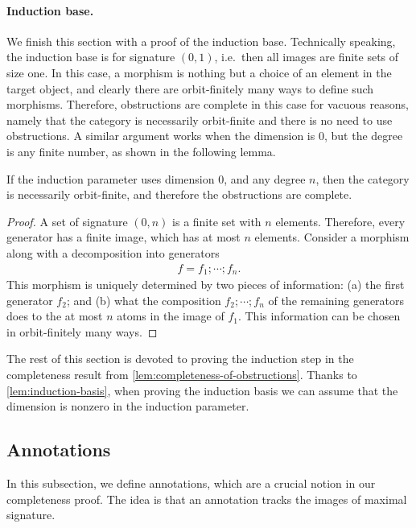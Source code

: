 \paragraph*{Induction base.}
We finish this section with a proof of the induction base. Technically speaking, the induction base is for signature $(0,1)$, i.e.~then all images are finite sets of size one. In this case, a morphism is nothing but a choice of an element in the target object, and clearly there are orbit-finitely many ways to define such morphisms. Therefore, obstructions are complete in this case for vacuous reasons, namely that the category is necessarily orbit-finite and there is no need to use obstructions. 
A similar argument works when the dimension is $0$, but the degree is any finite number, as shown in the following lemma. 
\begin{lemma}\label{lem:induction-basis}
        If the induction parameter uses dimension $0$, and any degree $n$, then the category is necessarily orbit-finite, and therefore the obstructions are complete.
\end{lemma}
\begin{proof}
    A set of signature $(0,n)$ is a finite set with $n$ elements. Therefore, every generator has a finite image, which has at most $n$ elements. Consider a morphism along with a decomposition into generators
    \begin{align*}
     f = f_1; \cdots ; f_n.     
    \end{align*}
    This morphism is uniquely determined by two pieces of information: (a) the first generator $f_2$; and (b) what the composition $f_2;\cdots ; f_n$ of the remaining generators does to the at most $n$ atoms in the image of $f_1$. This information can be chosen in orbit-finitely many ways. 
\end{proof}

The rest of this section is devoted to proving the induction step in the completeness result from \cref{lem:completeness-of-obstructions}.
Thanks to \cref{lem:induction-basis}, when proving the induction basis we can assume that the dimension is nonzero in the induction parameter.

\subsection{Annotations}
\label{sec:annotations}
In this subsection, we define annotations, which are a crucial notion in our completeness proof.  The idea is that an annotation tracks  the images of maximal signature.




